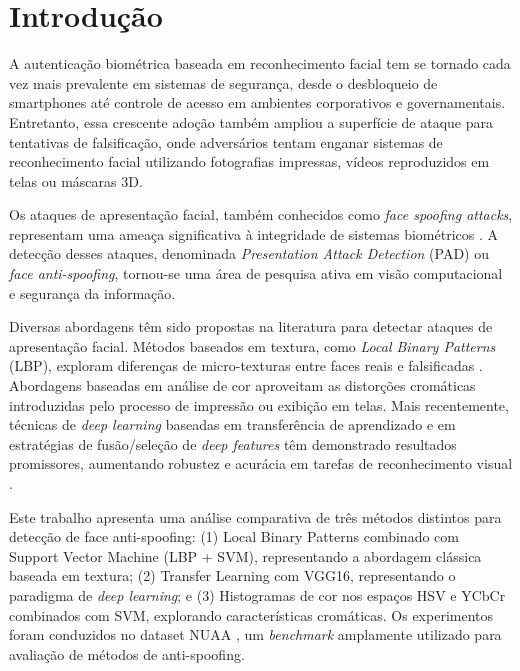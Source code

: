 \documentclass[
	article,			%
	11pt,				%
	oneside,			%
	a4paper,			%
	english,			%
	brazil,				%
	sumario=tradicional
	]{abntex2}
\begin{document}
\textual

\section*{Introdução}

A autenticação biométrica baseada em reconhecimento facial tem se tornado cada vez mais prevalente em sistemas de segurança, desde o desbloqueio de smartphones até controle de acesso em ambientes corporativos e governamentais. Entretanto, essa crescente adoção também ampliou a superfície de ataque para tentativas de falsificação, onde adversários tentam enganar sistemas de reconhecimento facial utilizando fotografias impressas, vídeos reproduzidos em telas ou máscaras 3D.

Os ataques de apresentação facial, também conhecidos como \textit{face spoofing attacks}, representam uma ameaça significativa à integridade de sistemas biométricos \cite{galbally2014}. A detecção desses ataques, denominada \textit{Presentation Attack Detection} (PAD) ou \textit{face anti-spoofing}, tornou-se uma área de pesquisa ativa em visão computacional e segurança da informação.

Diversas abordagens têm sido propostas na literatura para detectar ataques de apresentação facial. Métodos baseados em textura, como \textit{Local Binary Patterns} (LBP), exploram diferenças de micro-texturas entre faces reais e falsificadas \cite{chingovska2012}. Abordagens baseadas em análise de cor \cite{DBLP:journals/corr/BoulkenafetKH15} aproveitam as distorções cromáticas introduzidas pelo processo de impressão ou exibição em telas. Mais recentemente, técnicas de \textit{deep learning} baseadas em transferência de aprendizado e em estratégias de fusão/seleção de \textit{deep features} têm demonstrado resultados promissores, aumentando robustez e acurácia em tarefas de reconhecimento visual \cite{rashid2020sustainable}.

Este trabalho apresenta uma análise comparativa de três métodos distintos para detecção de face anti-spoofing: (1) Local Binary Patterns combinado com Support Vector Machine (LBP + SVM), representando a abordagem clássica baseada em textura; (2) Transfer Learning com VGG16, representando o paradigma de \textit{deep learning}; e (3) Histogramas de cor nos espaços HSV e YCbCr combinados com SVM, explorando características cromáticas. Os experimentos foram conduzidos no dataset NUAA \cite{nuaa2010,tan2010}, um \textit{benchmark} amplamente utilizado para avaliação de métodos de anti-spoofing.
\end{document}
